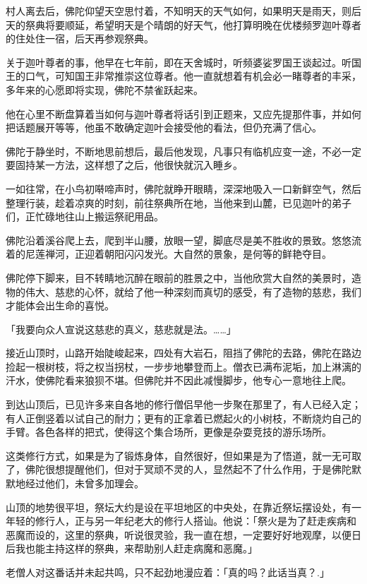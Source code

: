 \documentclass[12pt,twoside,openany]{book}
\begin{document}
村人离去后，佛陀仰望天空思忖着，不知明天的天气如何，如果明天是雨天，则后天的祭典将要顺延，希望明天是个晴朗的好天气，他打算明晚在优楼频罗迦叶尊者的住处住一宿，后天再参观祭典。

关于迦叶尊者的事，他早在七年前，即在天舍城时，听频婆娑罗国王谈起过。听国王的口气，可知国王非常推崇这位尊者。他一直就想着有机会必一睹尊者的丰采，多年来的心愿即将实现，佛陀不禁雀跃起来。

他在心里不断盘算着当如何与迦叶尊者将话引到正题来，又应先提那件事，并如何把话题展开等等，他虽不敢确定迦叶会接受他的看法，但仍充满了信心。

佛陀于静坐时，不断地思前想后，最后他发现，凡事只有临机应变一途，不必一定要固持某一方法，这样想了之后，他很快就沉入睡乡。

一如往常，在小鸟初啭啼声时，佛陀就睁开眼睛，深深地吸入一口新鲜空气，然后整理行装，趁着凉爽的时刻，前往祭典所在地，当他来到山麓，已见迦叶的弟子们，正忙碌地往山上搬运祭祀用品。

佛陀沿着溪谷爬上去，爬到半山腰，放眼一望，脚底尽是美不胜收的景致。悠悠流着的尼莲禅河，正迎着朝阳闪闪发光。大自然的景象，是何等的鲜艳夺目。

佛陀停下脚来，目不转睛地沉醉在眼前的胜景之中，当他欣赏大自然的美景时，造物的伟大、慈悲的心怀，就给了他一种深刻而真切的感受，有了造物的慈悲，我们才能体会出生命的喜悦。

「我要向众人宣说这慈悲的真义，慈悲就是法。……」

接近山顶时，山路开始陡峻起来，四处有大岩石，阻挡了佛陀的去路，佛陀在路边捡起一根树枝，将之权当拐杖，一步步地攀登而上。僧衣已满布泥垢，加上淋漓的汗水，使佛陀看来狼狈不堪。但佛陀并不因此减慢脚步，他专心一意地往上爬。

到达山顶后，已见许多来自各地的修行僧侣早他一步聚在那里了，有人已经入定；有人正倒竖着以试自己的耐力；更有的正拿着已燃起火的小树枝，不断烧灼自己的手臂。各色各样的把式，使得这个集合场所，更像是杂耍竞技的游乐场所。

这类修行方式，如果是为了锻炼身体，自然很好，但如果是为了悟道，就一无可取了，佛陀很想提醒他们，但对于冥顽不灵的人，显然起不了什么作用，于是佛陀默默地经过他们，未曾多加理会。

山顶的地势很平坦，祭坛大约是设在平坦地区的中央处，在靠近祭坛摆设处，有一年轻的修行人，正与另一年纪老大的修行人搭讪。他说：「祭火是为了赶走疾病和恶魔而设的，这里的祭典，听说很灵验，我一直在想，一定要好好地观摩，以便日后我也能主持这样的祭典，来帮助别人赶走病魔和恶魔。」

老僧人对这番话并未起共鸣，只不起劲地漫应着：「真的吗？此话当真？.」
\end{document}
